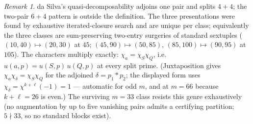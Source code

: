 \documentclass[11pt]{amsart}
\theoremstyle{remark}
\newtheorem{remark}[theorem]{Remark}
\begin{document}
\begin{remark}
da Silva's quasi-decomposability adjoins one pair and splits $4+4$; the two-pair $6+4$ pattern is outside
the definition. The three presentations were found by exhaustive iterated-closure search and are unique
per class; equivalently the three classes are sum-preserving two-entry surgeries of standard sextuples
($(10,40)\mapsto(20,30)$ at $45$; $(45,90)\mapsto(50,85)$, $(85,100)\mapsto(90,95)$ at $105$). The characters multiply
exactly: $\chi_a=\chi_S\chi_Q$, i.e.\ $u(a,p)=u(S,p)\,u(Q,p)$ at every split prime. (Juxtaposition
gives $\chi_a\chi_\delta=\chi_S\chi_Q$ for the adjoined $\delta=p_1*p_2$; the displayed form uses
$\chi_\delta=\chi^{k+\ell}(-1)=1$ --- automatic for odd $m$, and at $m=66$ because
$k+\ell=26$ is even.) The surviving $m=33$ class
resists this genre exhaustively (no augmentation by up to five vanishing pairs admits a certifying
partition; $5\nmid33$, so no standard blocks exist).
\end{remark}
\end{document}

